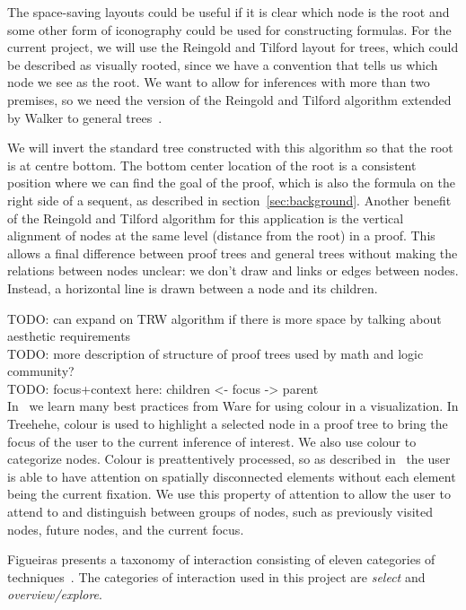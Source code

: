 \documentclass[conference]{IEEEtran}
\newcommand{\projectname}{Treehehe}
\begin{document}
The space-saving layouts could be useful if it is clear which node is the root and some other form of iconography could be used for constructing formulas. For the current project, we will use the Reingold and Tilford layout for trees, which could be described as visually rooted, since we have a convention that tells us which node we see as the root. We want to allow for inferences with more than two premises, so we need the version of the Reingold and Tilford algorithm extended by Walker to general trees~\cite{generaltreeslayout-walker}.

We will invert the standard tree constructed with this algorithm so that the root is at centre bottom. The bottom center location of the root is a consistent position where we can find the goal of the proof, which is also the formula on the right side of a sequent, as described in section~\ref{sec:background}. Another benefit of the Reingold and Tilford algorithm for this application is the vertical alignment of nodes at the same level (distance from the root) in a proof. This allows a final difference between proof trees and general trees without making the relations between nodes unclear: we don't draw and links or edges between nodes. Instead, a horizontal line is drawn between a node and its children.

TODO: can expand on TRW algorithm if there is more space by talking about aesthetic requirements \\

TODO: more description of structure of proof trees used by math and logic community? \\

TODO: focus+context here: children <- focus -> parent \\

In~\cite[Chapter 3]{infovis-ware} we learn many best practices from Ware for using colour in a visualization. In \projectname{}, colour is used to highlight a selected node in a proof tree to bring the focus of the user to the current inference of interest. We also use colour to categorize nodes. Colour is preattentively processed, so as described in~\cite[Chapter 11]{infovis-ware} the user is able to have attention on spatially disconnected elements without each element being the current fixation. We use this property of attention to allow the user to attend to and distinguish between groups of nodes, such as previously visited nodes, future nodes, and the current focus.

Figueiras presents a taxonomy of interaction consisting of eleven categories of techniques~\cite{interaction-figueiras}. The categories of interaction used in this project are \textit{select} and \textit{overview/explore}.
\end{document}
